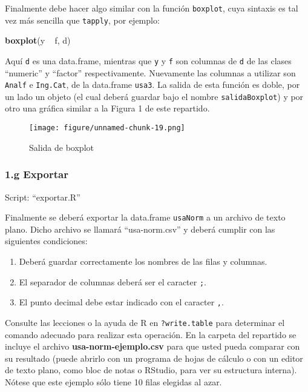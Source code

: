 \documentclass[]{article}
\makeatletter
\newenvironment{Shaded}{}{}
\newcommand{\KeywordTok}[1]{\textcolor[rgb]{0.00,0.44,0.13}{\textbf{{#1}}}}
\newcommand{\NormalTok}[1]{{#1}}
\def\maxwidth{\ifdim\Gin@nat@width>\linewidth\linewidth
\else\Gin@nat@width\fi}
\let\Oldincludegraphics\includegraphics
\renewcommand{\includegraphics}[1]{\Oldincludegraphics[width=\maxwidth]{#1}}
\makeatother
\begin{document}
Finalmente debe hacer algo similar con la función \texttt{boxplot}, cuya
sintaxis es tal vez más sencilla que \texttt{tapply}, por ejemplo:

\begin{Shaded}
\begin{Highlighting}[]
\KeywordTok{boxplot}\NormalTok{(y ~ f, d)}
\end{Highlighting}
\end{Shaded}
Aquí \texttt{d} es una data.frame, mientras que \texttt{y} y \texttt{f}
son columnas de \texttt{d} de las clases ``numeric'' y ``factor''
respectivamente. Nuevamente las columnas a utilizar son \texttt{Analf} e
\texttt{Ing.Cat}, de la data.frame \texttt{usa3}. La salida de esta
función es doble, por un lado un objeto (el cual deberá guardar bajo el
nombre \texttt{salidaBoxplot}) y por otro una gráfica similar a la
Figura 1 de este repartido.

\begin{figure}[htbp]
\centering
\texttt{[image: figure/unnamed-chunk-19.png]}
\caption{Salida de boxplot}
\end{figure}

\subsubsection{1.g Exportar}

Script: ``exportar.R''

Finalmente se deberá exportar la data.frame \texttt{usaNorm} a un
archivo de texto plano. Dicho archivo se llamará ``usa-norm.csv'' y
deberá cumplir con las siguientes condiciones:

\begin{enumerate}[1.]
\item
  Deberá guardar correctamente los nombres de las filas y columnas.
\item
  El separador de columnas deberá ser el caracter \texttt{;}.
\item
  El punto decimal debe estar indicado con el caracter \texttt{,}.
\end{enumerate}
Consulte las lecciones o la ayuda de R en \texttt{?write.table} para
determinar el comando adecuado para realizar esta operación. En la
carpeta del repartido se incluye el archivo
\textbf{usa-norm-ejemplo.csv} para que usted pueda comparar con su
resultado (puede abrirlo con un programa de hojas de cálculo o con un
editor de texto plano, como bloc de notas o RStudio, para ver su
estructura interna). Nótese que este ejemplo sólo tiene 10 filas
elegidas al azar.
\end{document}

